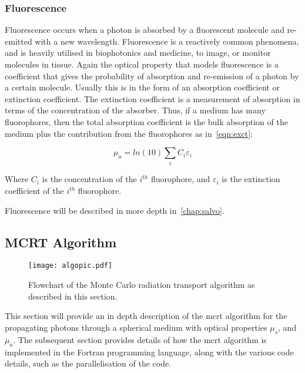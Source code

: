 \medskip

\subsubsection*{Fluorescence}



Fluorescence occurs when a photon is absorbed by a fluorescent molecule and re-emitted with a new wavelength. Fluorescence	is a reactively common phenomena, and is heavily utilised in biophotonics and medicine, to image, or monitor molecules in tissue. Again the optical property that models fluorescence is a coefficient that gives the probability of absorption and re-emission of a photon by a certain molecule. Usually this is in the form of an absorption coefficient or extinction coefficient. The extinction coefficient is a measurement of absorption in terms of the concentration of the absorber. Thus, if a medium has many fluorophores, then the total absorption coefficient is the bulk absorption of the medium plus the contribution from the fluorophores as in~\cref{eqn:exct}:

\begin{equation}
\mu_a=ln(10) \sum_i C_i \varepsilon_i
\label{eqn:exct}	
\end{equation}

Where $C_i$ is the concentration of the $i^{th}$ fluorophore, and $\varepsilon_i$ is the extinction coefficient of the $i^{th}$ fluorophore.

Fluorescence will be described in more depth in~\cref{chap:salvo}.
\newpage
\subsection{MCRT Algorithm}\label{sec:algorithmMCRT}

\begin{wrapfigure}{r}{.45\textwidth}
\centering
\texttt{[image: algopic.pdf]}
\caption{Flowchart of the Monte Carlo radiation transport algorithm as described in this section.}
\label{fig:algo}
\vspace{-61pt}
\end{wrapfigure}
\FloatBarrier

This section will provide an in depth description of the \gls*{mcrt} algorithm for the propagating photons through a spherical medium with optical properties $\mu_s$, and $\mu_a$. The subsequent section provides details of how the \gls*{mcrt} algorithm is implemented in the Fortran programming language, along with the various code details, such as the parallelisation of the code.

